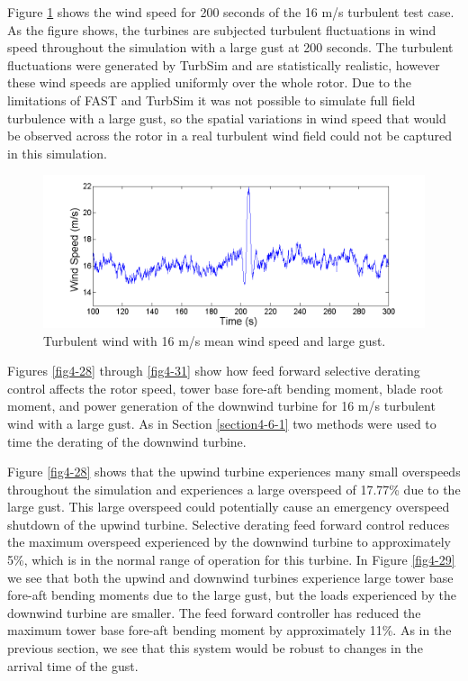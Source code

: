 Figure \ref{fig4-27} shows the wind speed for 200 seconds of the 16 m/s turbulent test case. As the figure shows, the turbines are subjected turbulent fluctuations in wind speed throughout the simulation with a large gust at 200 seconds. The turbulent fluctuations were generated by TurbSim and are statistically realistic, however these wind speeds are applied uniformly over the whole rotor. Due to the limitations of FAST and TurbSim it was not possible to simulate full field turbulence with a large gust, so the spatial variations in wind speed that would be observed across the rotor in a real turbulent wind field could not be captured in this simulation.

\begin{figure}[htbp]
	\centering
		\includegraphics[trim = {1cm 0 2cm 0}, clip, width = \linewidth]{Figures/ch4Figures/fig4-27.png}
		
	\caption{Turbulent wind with 16 m/s mean wind speed and large gust.}
	\label{fig4-27}
\end{figure}

Figures \ref{fig4-28} through \ref{fig4-31} show how feed forward selective derating control affects the rotor speed, tower base fore-aft bending moment, blade root moment, and power generation of the downwind turbine for 16 m/s turbulent wind with a large gust. As in Section \ref{section4-6-1} two methods were used to time the derating of the downwind turbine.

Figure \ref{fig4-28} shows that the upwind turbine experiences many small overspeeds throughout the simulation and experiences a large overspeed of 17.77\% due to the large gust. This large overspeed could potentially cause an emergency overspeed shutdown of the upwind turbine. Selective derating feed forward control reduces the maximum overspeed experienced by the downwind turbine to approximately 5\%, which is in the normal range of operation for this turbine. In Figure \ref{fig4-29} we see that both the upwind and downwind turbines experience large tower base fore-aft bending moments due to the large gust, but the loads experienced by the downwind turbine are smaller. The feed forward controller has reduced the maximum tower base fore-aft bending moment by approximately 11\%. As in the previous section, we see that this system would be robust to changes in the arrival time of the gust. 


